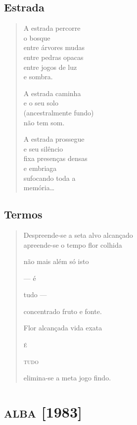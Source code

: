 \chapter{Estrada}

\begin{verse}
A estrada percorre\\
\qquad\qquad o bosque\\
entre árvores mudas\\
entre pedras opacas\\
entre jogos de luz\\
\qquad\qquad e sombra.

A estrada caminha\\
e o seu solo\\
(ancestralmente fundo)\\
não tem som.

A estrada prossegue\\
e seu silêncio\\
fixa presenças densas\\
e embriaga\\
sufocando toda a\\
\qquad\qquad memória\ldots{}
\end{verse}

\chapter{Termos}

\begin{verse}
Despreende-se a seta \qquad\qquad alvo alcançado\\
apreende-se o tempo \qquad\qquad flor colhida

não mais além \qquad\qquad\qquad\quad só isto

\quad\qquad\qquad\qquad\qquad --- é

\quad\qquad\qquad\qquad\qquad\quad tudo ---

\qquad\qquad concentrado fruto e fonte.

Flor alcançada \qquad\qquad\qquad vida exata

\qquad\qquad\qquad\qquad\textsc{é}

\qquad\qquad\qquad\qquad\textsc{tudo}

elimina-se a meta \qquad\qquad\quad jogo findo.
\end{verse}

\part{\textsc{alba} {[}1983{]}}

